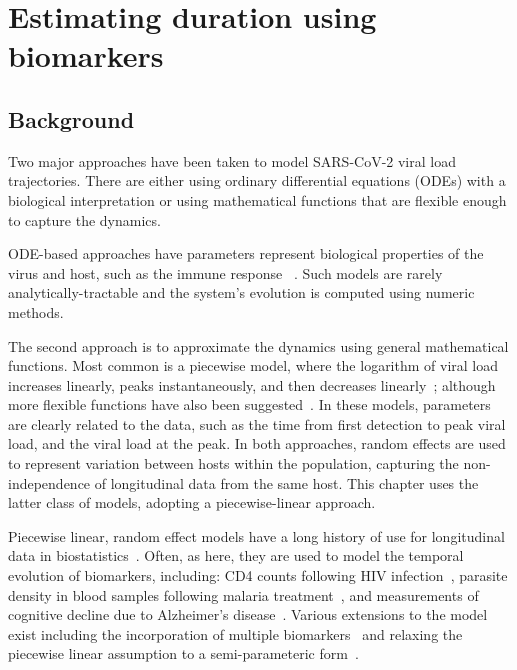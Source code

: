 \documentclass[thesis.tex]{subfiles}
\begin{document}
\ifSubfilesClassLoaded{
  \setcounter{chapter}{4}
}

\chapter{Estimating duration using biomarkers} \label{ATACCC}

\section{Background}

Two major approaches have been taken to model SARS-CoV-2 viral load trajectories.
There are either using ordinary differential equations (ODEs) with a biological interpretation or using mathematical functions that are flexible enough to capture the dynamics.

ODE-based approaches have parameters represent biological properties of the virus and host, such as the immune response ~\autocites[e.g.:][]{ejimaEstimation,keVivo,kimQuantitative,goncalvesTiming,perelsonMechanistic}.
Such models are rarely analytically-tractable and the system's evolution is computed using numeric methods.

The second approach is to approximate the dynamics using general mathematical functions.
Most common is a piecewise model, where the logarithm of viral load increases linearly, peaks instantaneously, and then decreases linearly~\autocites{clearyUsing,kisslerViral,larremoreTest}; although more flexible functions have also been suggested~\autocites{quiltyQuarantine}.
In these models, parameters are clearly related to the data, such as the time from first detection to peak viral load, and the viral load at the peak.
In both approaches, random effects are used to represent variation between hosts within the population, capturing the non-independence of longitudinal data from the same host.
This chapter uses the latter class of models, adopting a piecewise-linear approach.

Piecewise linear, random effect models have a long history of use for longitudinal data in biostatistics~\autocites{slateStatistical}.
Often, as here, they are used to model the temporal evolution of biomarkers, including:
CD4 counts following HIV infection~\autocites{langeHierarchical,lynchPredicting}, parasite density in
blood samples following malaria treatment~\autocites{fogartyBayesian}, and measurements
of cognitive decline due to Alzheimer's disease~\autocites{bealisleBayesian}.
Various extensions to the model exist including the incorporation of multiple biomarkers~\autocites{inoueModeling,giardinaGetting} and relaxing the piecewise linear assumption to a semi-parameteric form~\autocites{zegerSemiparametric}.
\end{document}

